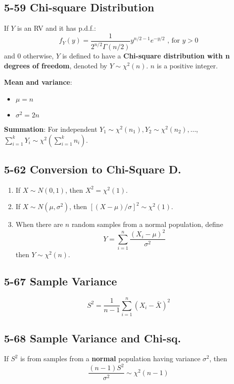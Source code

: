 \documentclass[12pt,landscape]{article}
\begin{document}
\begin{multicols}{3}
    \subsection{5-59 Chi-square Distribution}
    If $Y$ is an RV and it has p.d.f.:
        $$ f_Y(y) = \frac{1}{2^{n/2}\Gamma(n/2)} y^{n/2-1} e^{-y/2} \text{ , for } y > 0 $$
    and 0 otherwise, $Y$ is defined to have a \textbf{Chi-square distribution with n degrees of freedom}, denoted by
    $ Y \sim \chi^2(n)$. $n$ is a positive integer.

    \textbf{Mean and variance}:
    \begin{itemize}
        \item $\mu = n$
        \item $\sigma^2 = 2n$
    \end{itemize}

    \textbf{Summation}:
    For independent $Y_1 \sim \chi^2(n_1), Y_2 \sim \chi^2(n_2), \dots$, $\sum_{i = 1}^k Y_i \sim \chi^2(\sum_{i = 1}^k n_i)$.

    \subsection{5-62 Conversion to Chi-Square D.}
    \begin{enumerate}
        \item If $X \sim N(0,1)$, then $X^2 = \chi^2(1)$.
        \item If $X \sim N(\mu, \sigma^2)$, then $[(X-\mu)/\sigma]^2 \sim \chi^2(1)$.
        \item When there are $n$ random samples from a normal population, define
            $$ Y = \sum_{i=1}^n \frac{(X_i - \mu)^2}{\sigma^2} $$
            then $Y \sim \chi^2(n)$.
    \end{enumerate}

    \subsection{5-67 Sample Variance}
        $$ S^2 = \frac{1}{n-1} \sum_{i=1}^n (X_i - \bar{X})^2 $$
    
    \subsection{5-68 Sample Variance and Chi-sq.}
    If $S^2$ is from samples from a \textbf{normal} population having variance $\sigma^2$, then
        $$ \frac{(n-1)S^2}{\sigma^2} \sim \chi^2 (n-1) $$
    

\end{multicols}
\end{document}
